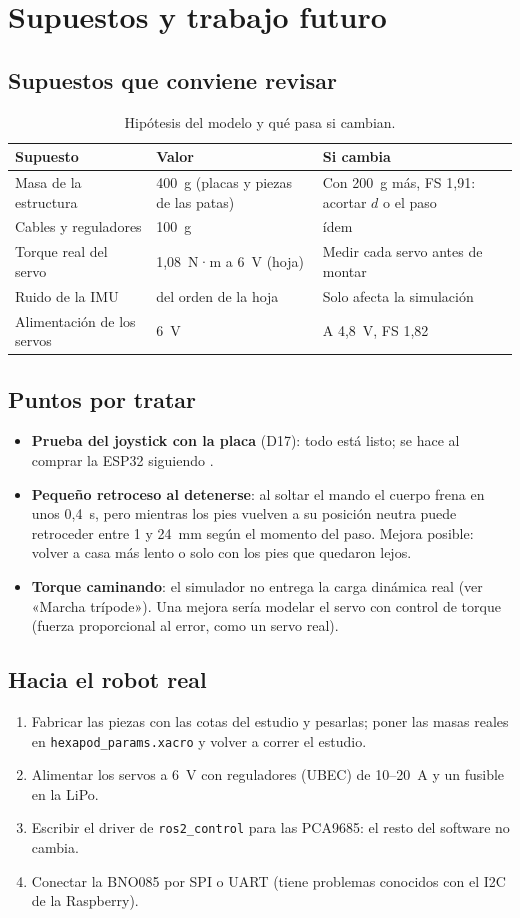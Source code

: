 \documentclass[11pt,a4paper]{article}
\newcommand{\seccion}[1]{\Needspace{18\baselineskip}\section{#1}}
\newcommand{\subsec}[1]{\Needspace{9\baselineskip}\subsection{#1}}
\begin{document}
\seccion{Supuestos y trabajo futuro}

\subsec{Supuestos que conviene revisar}

\begin{table}[H]\centering\small
\caption{Hipótesis del modelo y qué pasa si cambian.}\label{tab:supuestos}
\begin{tabularx}{\linewidth}{@{}lYY@{}}
\toprule
\textbf{Supuesto} & \textbf{Valor} & \textbf{Si cambia}\\\midrule
Masa de la estructura & 400~g (placas y piezas de las patas) & Con 200~g más, FS 1,91: acortar $d$ o el paso\\
Cables y reguladores & 100~g & ídem\\
Torque real del servo & 1,08~N·m a 6~V (hoja) & Medir cada servo antes de montar\\
Ruido de la IMU & del orden de la hoja & Solo afecta la simulación\\
Alimentación de los servos & 6~V & A 4,8~V, FS 1,82\\
\bottomrule
\end{tabularx}
\end{table}

\subsec{Puntos por tratar}

\begin{itemize}
  \item \textbf{Prueba del joystick con la placa} (D17): todo está listo; se
  hace al comprar la ESP32 siguiendo .
  \item \textbf{Pequeño retroceso al detenerse}: al soltar el mando el cuerpo
  frena en unos 0,4~s, pero mientras los pies vuelven a su posición neutra
  puede retroceder entre 1 y 24~mm según el momento del paso. Mejora
  posible: volver a casa más lento o solo con los pies que quedaron lejos.
  \item \textbf{Torque caminando}: el simulador no entrega la carga dinámica
  real (ver «Marcha trípode»). Una mejora sería modelar el servo con control de
  torque (fuerza proporcional al error, como un servo real).
\end{itemize}

\subsec{Hacia el robot real}

\begin{enumerate}
  \item Fabricar las piezas con las cotas del estudio y pesarlas; poner las
  masas reales en \texttt{hexapod\_params.xacro} y volver a correr el estudio.
  \item Alimentar los servos a 6~V con reguladores (UBEC) de 10--20~A y un
  fusible en la LiPo.
  \item Escribir el driver de \texttt{ros2\_control} para las PCA9685: el
  resto del software no cambia.
  \item Conectar la BNO085 por SPI o UART (tiene problemas conocidos con el
  I2C de la Raspberry).
\end{enumerate}
\end{document}
